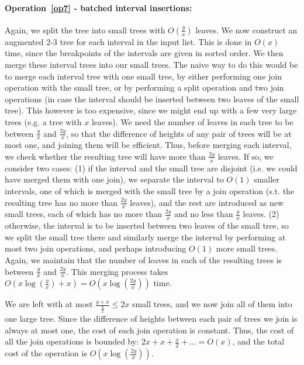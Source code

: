 \documentclass[11pt,a4paper]{article}
\theoremstyle{definition}
\theoremstyle{remark}
\begin{document}
\paragraph{Operation~\ref{op7} - batched interval insertions:}
Again, we split the tree into small trees with $O(\frac{y}{x})$ leaves. We now construct an augmented 2-3 tree for each interval in the input list. This is done in $O(x)$ time, since the breakpoints of the intervals are given in sorted order. We then merge these interval trees into our small trees. 
The naive way to do this would be to merge each interval tree with one small tree, by either performing one join operation with the small tree, or by performing a split operation and two join operations (in case the interval should be inserted between two leaves of the small tree).
This however is too expensive, since we might end up with a few very large trees (e.g. a tree with $x$ leaves). 
%
We need the number of leaves in each tree to be between $\frac{y}{x}$ and $\frac{2y}{x}$, so that the difference of heights of any pair of trees will be at most one, and joining them will be efficient. Thus, before merging each interval, we check whether the resulting tree will have more than $\frac{2y}{x}$ leaves. If so, we consider two cases: (1) if the interval and the small tree are disjoint (i.e. we could have merged them with one join), we separate the interval to $O(1)$ smaller intervals, one of which is merged with the small tree by a join operation (s.t. the resulting tree has no more than $\frac{2y}{x}$ leaves), and the rest are introduced as new small trees, each of which has no more than $\frac{2y}{x}$ and no less than $\frac{y}{x}$ leaves. (2) otherwise, the interval is to be inserted between two leaves of the small tree, so we split the  small tree there and similarly merge the interval by performing at most two join operations, and perhaps introducing $O(1)$ more small trees. Again, we maintain that the number of leaves in each of the resulting trees is between $\frac{y}{x}$ and $\frac{2y}{x}$. This merging process takes $O(x \log(\frac{y}{x}) + x) = O(x \log (\frac{2y}{x}))$ time.

We are left with at most $\frac{y+x}{\frac{y}{x}} \leq  2x$ small trees, and we now join all of them into one large tree. Since the difference of heights between each pair of trees we join is always at most one, the cost of each join operation is constant. Thus, the cost of all the join operations is bounded by: $2x+x+\frac{x}{2} +\ldots = O(x)$, and the total cost of the operation is $O(x \log(\frac{2y}{x}))$.
\end{document}
